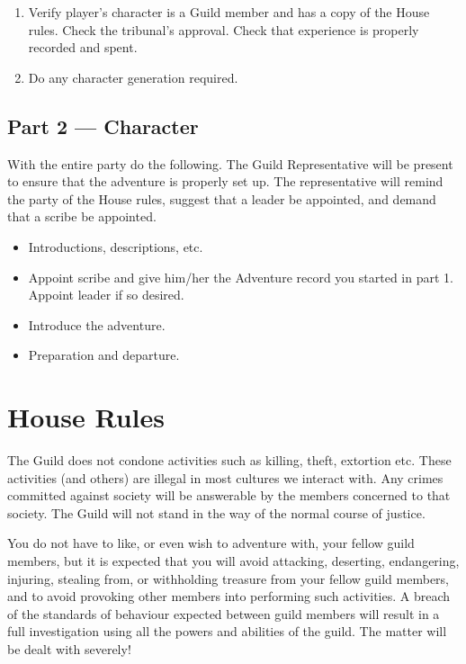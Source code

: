 \documentclass{article}
\begin{document}
\begin{multicols}{2}
\begin{enumerate}
\item
Verify player's character is a Guild member and has a copy of the
House rules.  Check the tribunal's approval.  Check that experience is
properly recorded and spent.

\item
Do any character generation required.

\end{enumerate}

\subsection{Part 2 --- Character}

With the entire party do the following.  The Guild Representative will
be present to ensure that the adventure is properly set up.  The
representative will remind the party of the House rules, suggest that
a leader be appointed, and demand that a scribe be appointed.

\begin{itemize}

\item
Introductions, descriptions, etc.

\item
Appoint scribe and give him/her the Adventure record you started in
part 1.  Appoint leader if so desired.

\item
Introduce the adventure.

\item
Preparation and departure.

\end{itemize}

\section{House Rules}

The Guild does not condone activities such as killing, theft,
extortion etc.  These activities (and others) are illegal in most
cultures we interact with.  Any crimes committed against society will
be answerable by the members concerned to that society.  The Guild
will not stand in the way of the normal course of justice.

You do not have to like, or even wish to adventure with, your fellow
guild members, but it is expected that you will avoid attacking,
deserting, endangering, injuring, stealing from, or withholding
treasure from your fellow guild members, and to avoid provoking other
members into performing such activities.  A breach of the standards of
behaviour expected between guild members will result in a full
investigation using all the powers and abilities of the guild.  The
matter will be dealt with severely!


\end{multicols}
\end{document}
